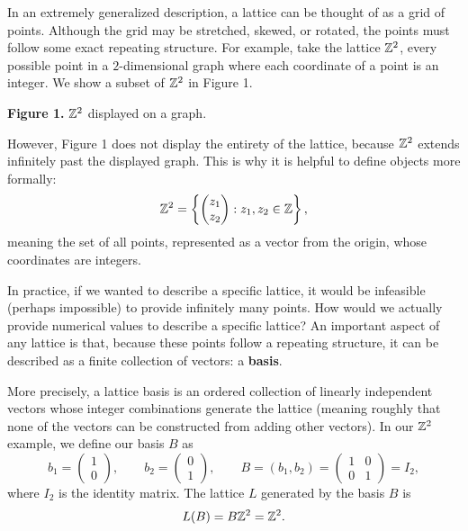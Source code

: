 \documentclass{article}
\begin{document}
\blogsubtitle{}

In an extremely generalized description, a lattice can be thought of as a grid of points.
Although the grid may be stretched, skewed, or rotated, the points must follow some exact repeating structure.
For example, take the lattice $\mathbb{Z}^2$, every possible point in a $2$-dimensional graph where each coordinate of a point is an integer.
We show a subset of $\mathbb{Z}^2$ in Figure 1.

{\textbf{Figure 1.} $\mathbb{Z}^2$ displayed on a graph.}


However, Figure 1 does not display the entirety of the lattice, because $\mathbb{Z}^2$ extends infinitely past the displayed graph.
This is why it is helpful to define objects more formally:
\[
\mathbb{Z}^2
=
\left\{
\begin{pmatrix}
z_1\\
z_2
\end{pmatrix}
:
z_1,z_2\in\mathbb{Z}
\right\},
\]
meaning the set of all points, represented as a vector from the origin, whose coordinates are integers.

In practice, if we wanted to describe a specific lattice, it would be infeasible (perhaps impossible) to provide infinitely many points.
How would we actually provide numerical values to describe a specific lattice?
An important aspect of any lattice is that, because these points follow a repeating structure, it can be described as a finite collection of vectors: a \textbf{basis}. 

More precisely, a lattice basis is an ordered collection of linearly independent vectors whose integer combinations generate the lattice (meaning roughly that none of the vectors can be constructed from adding other vectors).
In our $\mathbb{Z}^2$ example, we define our basis $B$ as
\[
b_1=
\begin{pmatrix}
1\\
0
\end{pmatrix},
\qquad
b_2=
\begin{pmatrix}
0\\
1
\end{pmatrix},
\qquad
B
=
\left(b_1, b_2\right)
=
\begin{pmatrix}
1 & 0\\
0 & 1
\end{pmatrix}
= I_2,
\]
where $I_2$ is the identity matrix.
The lattice $L$ generated by the basis $B$ is
\[
L(B)
=
B\mathbb{Z}^2
=
\mathbb{Z}^2.
\]
\end{document}
